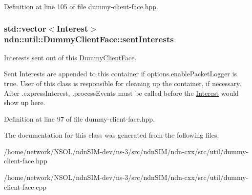 Definition at line 105 of file dummy-\/client-\/face.\+hpp.

\subsubsection[{\texorpdfstring{sent\+Interests}{sentInterests}}]{\setlength{\rightskip}{0pt plus 5cm}std\+::vector$<${\bf Interest}$>$ ndn\+::util\+::\+Dummy\+Client\+Face\+::sent\+Interests}\hypertarget{classndn_1_1util_1_1DummyClientFace_a0abd6e1b6f8a0fcf525fc521509dafd5}{}\label{classndn_1_1util_1_1DummyClientFace_a0abd6e1b6f8a0fcf525fc521509dafd5}


Interests sent out of this \hyperlink{classndn_1_1util_1_1DummyClientFace}{Dummy\+Client\+Face}. 

Sent Interests are appended to this container if options.\+enable\+Packet\+Logger is true. User of this class is responsible for cleaning up the container, if necessary. After .express\+Interest, .process\+Events must be called before the \hyperlink{classndn_1_1Interest}{Interest} would show up here. 

Definition at line 97 of file dummy-\/client-\/face.\+hpp.



The documentation for this class was generated from the following files\+:\begin{DoxyCompactItemize}
\item 
/home/network/\+N\+S\+O\+L/ndn\+S\+I\+M-\/dev/ns-\/3/src/ndn\+S\+I\+M/ndn-\/cxx/src/util/dummy-\/client-\/face.\+hpp\item 
/home/network/\+N\+S\+O\+L/ndn\+S\+I\+M-\/dev/ns-\/3/src/ndn\+S\+I\+M/ndn-\/cxx/src/util/dummy-\/client-\/face.\+cpp\end{DoxyCompactItemize}
